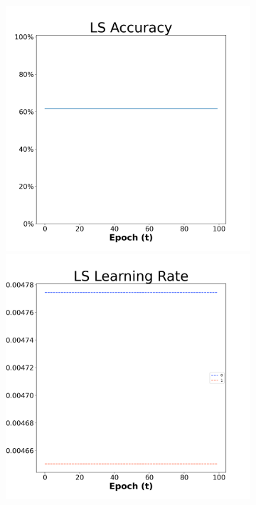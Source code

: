 \begin{figure}[H]
    \centering %
\begin{subfigure}{0.3\textwidth}
  \includegraphics[width=\linewidth]{images/exper1/SP/LS_0.01_acc.png}
    \includegraphics[width=\linewidth]{images/exper1/SP/LS_0.01_lr.png}

\end{subfigure}
\end{figure}
